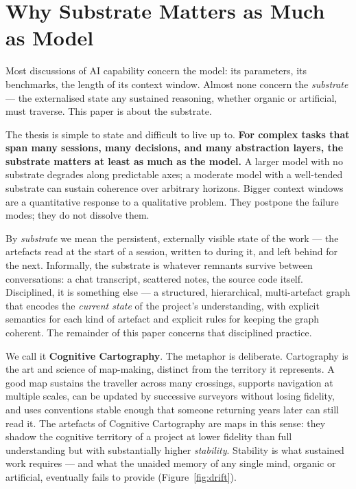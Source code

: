 \documentclass[11pt,a4paper,twocolumn]{article}
\begin{document}
\section{Why Substrate Matters as Much as Model}

Most discussions of AI capability concern the model: its parameters,
its benchmarks, the length of its context window. Almost none concern
the \emph{substrate} --- the externalised state any sustained
reasoning, whether organic or artificial, must traverse. This paper
is about the substrate.

The thesis is simple to state and difficult to live up to.
\textbf{For complex tasks that span many sessions, many decisions,
and many abstraction layers, the substrate matters at least as much
as the model.} A larger model with no substrate degrades along
predictable axes; a moderate model with a well-tended substrate can
sustain coherence over arbitrary horizons. Bigger context windows
are a quantitative response to a qualitative problem. They postpone
the failure modes; they do not dissolve them.

By \emph{substrate} we mean the persistent, externally visible state
of the work --- the artefacts read at the start of a session,
written to during it, and left behind for the next. Informally, the
substrate is whatever remnants survive between conversations: a chat
transcript, scattered notes, the source code itself. Disciplined,
it is something else --- a structured, hierarchical, multi-artefact
graph that encodes the \emph{current state} of the project's
understanding, with explicit semantics for each kind of artefact and
explicit rules for keeping the graph coherent. The remainder of this
paper concerns that disciplined practice.

We call it \textbf{Cognitive Cartography}. The metaphor is
deliberate. Cartography is the art and science of map-making,
distinct from the territory it represents. A good map sustains the
traveller across many crossings, supports navigation at multiple
scales, can be updated by successive surveyors without losing
fidelity, and uses conventions stable enough that someone returning
years later can still read it. The artefacts of Cognitive
Cartography are maps in this sense: they shadow the cognitive
territory of a project at lower fidelity than full understanding but
with substantially higher \emph{stability}. Stability is what
sustained work requires --- and what the unaided memory of any
single mind, organic or artificial, eventually fails to provide
(Figure~\ref{fig:drift}).
\end{document}
